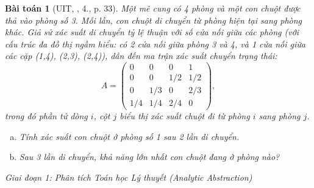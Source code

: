 \documentclass{article}
\newtheorem{baitoan}{Bài toán}
\begin{document}
\begin{baitoan}[UIT, \cite{VMS_VMC2025}, 4., p. 33]
	Một mê cung có 4 phòng và một con chuột được thả vào phòng số 3. Mỗi lần, con chuột di chuyển từ phòng hiện tại sang phòng khác. Giả sử xác suất di chuyển tỷ lệ thuận với số cửa nối giữa các phòng (với cấu trúc đa đồ thị ngầm hiểu: có 2 cửa nối giữa phòng 3 và 4, và 1 cửa nối giữa các cặp (1,4), (2,3), (2,4)), dẫn đến ma trận xác suất chuyển trạng thái:
	\begin{equation*}
		A = \begin{pmatrix}
			0 & 0 & 0 & 1 \\
			0 & 0 & 1/2 & 1/2 \\
			0 & 1/3 & 0 & 2/3 \\
			1/4 & 1/4 & 2/4 & 0
		\end{pmatrix},
	\end{equation*}
	trong đó phần tử dòng $i$, cột $j$ biểu thị xác suất chuột đi từ phòng $i$ sang phòng $j$.
	\begin{enumerate}[(a)]
		\item Tính xác suất con chuột ở phòng số 1 sau 2 lần di chuyển.
		\item Sau 3 lần di chuyển, khả năng lớn nhất con chuột đang ở phòng nào?
	\end{enumerate}
\end{baitoan}

\vspace{0.5em}\noindent\emph{Giai đoạn 1: Phân tích Toán học Lý thuyết (Analytic Abstraction)}
\end{document}
